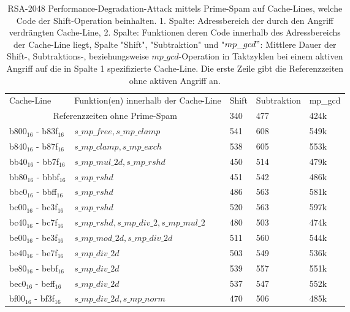 \begin{table}[h]
\caption{RSA-2048 Performance-Degradation-Attack mittels Prime-Spam auf Cache-Lines, welche Code der Shift-Operation beinhalten. 1. Spalte: Adressbereich der durch den Angriff verdrängten Cache-Line, 2. Spalte: Funktionen deren Code innerhalb des Adressbereichs der Cache-Line liegt, Spalte "Shift", "Subtraktion" und "$mp\_gcd"$: Mittlere Dauer der Shift-, Subtraktions-, beziehungsweise $mp\_gcd$-Operation in Taktzyklen bei einem aktiven Angriff auf die in Spalte 1 spezifizierte Cache-Line. Die erste Zeile gibt die Referenzzeiten ohne aktiven Angriff an. }
\label{tbl:PerformanceDegShift}
\begin{tabular}{lllll}
Cache-Line  & Funktion(en) innerhalb der Cache-Line                                  & Shift & Subtraktion & mp\_gcd \\[10pt]
\multicolumn{2}{c}{Referenzzeiten ohne Prime-Spam}                      & 340   & 477         & 424k    \\
b800$_{16}$ - b83f$_{16}$ & $s\_mp\_free, s\_mp\_clamp$                 & 541   & 608         & 549k    \\
b840$_{16}$ - b87f$_{16}$ & $s\_mp\_clamp, s\_mp\_exch$                 & 538   & 605         & 553k    \\
bb40$_{16}$ - bb7f$_{16}$ & $s\_mp\_mul\_2d, s\_mp\_rshd$               & 450   & 514         & 479k    \\
bb80$_{16}$ - bbbf$_{16}$ & $s\_mp\_rshd$                               & 451   & 542         & 486k    \\
bbc0$_{16}$ - bbff$_{16}$ & $s\_mp\_rshd$                               & 486   & 563         & 581k    \\
bc00$_{16}$ - bc3f$_{16}$ & $s\_mp\_rshd$                               & 520   & 563         & 597k    \\
bc40$_{16}$ - bc7f$_{16}$ & $s\_mp\_rshd, s\_mp\_div\_2, s\_mp\_mul\_2$ & 480   & 503         & 474k    \\
be00$_{16}$ - be3f$_{16}$ & $s\_mp\_mod\_2d, s\_mp\_div\_2d$            & 511   & 560         & 544k    \\
be40$_{16}$ - be7f$_{16}$ & $s\_mp\_div\_2d$                            & 503   & 549         & 536k    \\
be80$_{16}$ - bebf$_{16}$ & $s\_mp\_div\_2d$                            & 539   & 557         & 551k    \\
bec0$_{16}$ - beff$_{16}$ & $s\_mp\_div\_2d$                            & 537   & 547         & 552k    \\
bf00$_{16}$ - bf3f$_{16}$ & $s\_mp\_div\_2d, s\_mp\_norm$               & 470   & 506         & 485k   
\end{tabular}
\end{table}

